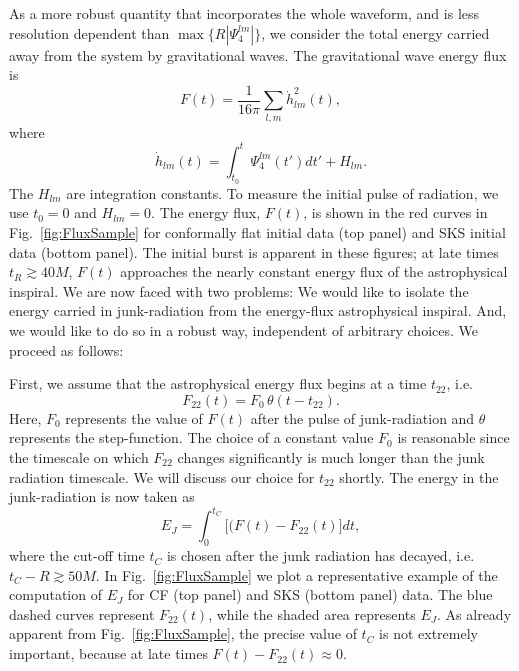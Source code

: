 As a more robust quantity that incorporates the whole waveform, and is
less resolution dependent than $\max\{R|\Psi_4^{lm}|\}$, we consider the
total energy carried away from the system by gravitational waves. The
 gravitational wave energy flux is~\citep{Boyle:2008}
\begin{equation}
F(t) =\frac{1}{16\pi}\sum_{l,m}\dot{h}_{lm}^2(t),
\end{equation}
where
\begin{equation}
\dot{h}_{lm}(t)=\int_{t_0}^{t}{\Psi_4^{lm}(t')dt'} + H_{lm}.
\end{equation}
The $H_{lm}$ are integration constants.  To measure the
  initial pulse of radiation, we use $t_0=0$ and $H_{lm}=0$.  The energy flux, $F(t)$, is shown in
the red curves in Fig.~\ref{fig:FluxSample} for conformally flat initial data (top
panel) and SKS initial data (bottom panel).  The initial burst
  is apparent in these figures; at late times $t_R\gtrsim 40M$, $F(t)$
  approaches the nearly constant energy flux of the astrophysical
  inspiral.  We are now faced with two problems: We would like to
  isolate the energy carried in junk-radiation from the energy-flux
  astrophysical inspiral.  And, we would like to do so in a robust way, 
independent of arbitrary choices.  We
  proceed as follows:

  First, we assume that the astrophysical energy flux begins at a time
  $t_{22}$, i.e.
\begin{equation}
  F_{22}(t) = F_0\,\theta(t-t_{22}).
\end{equation}
Here, $F_0$ represents the value of $F(t)$ after the pulse of
junk-radiation and $\theta$ represents the step-function.
The choice of a constant value $F_0$ is reasonable since the
timescale on which $F_{22}$ changes significantly is much longer than
the junk radiation timescale.
We will
discuss our choice for $t_{22}$ shortly.  The energy in the
junk-radiation is now taken as
\begin{equation}\label{eq:EJ}
E_J=\int_0^{t_C}\big[(F(t)-F_{22}(t)\big]dt,
\end{equation}
where the cut-off time $t_C$ is chosen after the junk radiation has
decayed, i.e. $t_C-R\gtrsim 50M$.  In Fig.~\ref{fig:FluxSample} we
plot a representative example of the computation of $E_J$ for CF (top
panel) and SKS (bottom panel) data. The blue dashed curves represent
$F_{22}(t)$, while the shaded area represents $E_J$.
As
already apparent from Fig.~\ref{fig:FluxSample}, the precise value of
$t_C$ is not extremely important, because at late times $F(t)-F_{22}(t)\approx 0$.  


